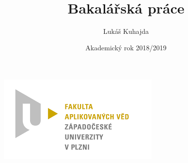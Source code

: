 \documentclass[12pt]{report}
\begin{document}
\title{Bakalářská práce}
\author{Lukáš Kuhajda}
\date{Akademický rok 2018/2019}
\begin{titlepage}
	\begin{center}
		\includegraphics[scale=0.5]{logo_zcu}\\
		\vspace{5cm}
		\begin{Large}
			\textbf{\thetitle}\\
		\end{Large}
		
		\vspace{3cm}
		\theauthor\\
		\vspace{5cm}
		\thedate
	\end{center}
\end{titlepage}
\newpage	
	
\tableofcontents
\newpage
\end{document}
